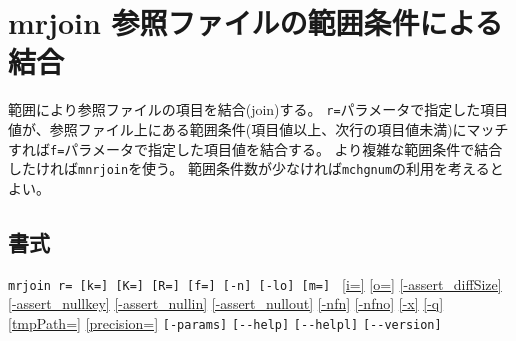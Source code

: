 
%

\section{mrjoin 参照ファイルの範囲条件による結合\label{sect:mrjoin}}
範囲により参照ファイルの項目を結合(join)する。
\verb|r=|パラメータで指定した項目値が、参照ファイル上にある範囲条件(項目値以上、次行の項目値未満)にマッチすれば\verb|f=|パラメータで指定した項目値を結合する。
より複雑な範囲条件で結合したければ\verb|mnrjoin|を使う。
範囲条件数が少なければ\verb|mchgnum|の利用を考えるとよい。

\subsection*{書式}
\verb/mrjoin r= [k=] [K=] [R=] [f=] [-n] [-lo] [m=] /
\hyperref[sect:option_i]{[i=]}
\hyperref[sect:option_o]{[o=]}
\hyperref[sect:option_assert_diffSize]{[-assert\_diffSize]}
\hyperref[sect:option_assert_nullkey]{[-assert\_nullkey]}
\hyperref[sect:option_assert_nullin]{[-assert\_nullin]}
\hyperref[sect:option_assert_nullout]{[-assert\_nullout]}
\hyperref[sect:option_nfn]{[-nfn]} 
\hyperref[sect:option_nfno]{[-nfno]}  
\hyperref[sect:option_x]{[-x]}
\hyperref[sect:option_q]{[-q]}
\hyperref[sect:option_option_tmppath]{[tmpPath=]}
\hyperref[sect:option_precision]{[precision=]}
\verb|[-params]|
\verb|[--help]|
\verb|[--helpl]|
\verb|[--version]|\\

